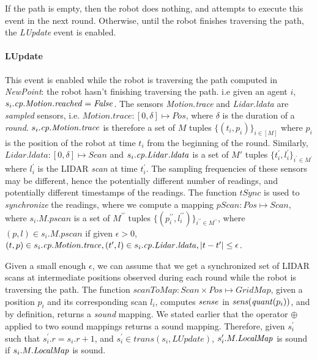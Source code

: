 If the path is empty, then the robot does nothing, and attempts to execute this event in the next round. Otherwise, until the robot finishes traversing the path, the \emph{LUpdate} event is enabled.

\paragraph{LUpdate}
This event is enabled while the robot is traversing the path computed in \emph{NewPoint}: the robot hasn't finishing traversing the path. i.e given an agent $i$, $s_i.\mathit{cp}.\mathit{Motion.reached}  = \mathit{False}$. The sensors \emph{Motion.trace} and \emph{Lidar.ldata} are \emph{sampled} sensors, i.e. $\mathit{Motion.trace}: [0,\delta] \mapsto \mathit{Pos}$, where $\delta$ is the duration of a \emph{round}. $s_i.\mathit{cp}.\mathit{Motion.trace}$ is therefore a set of $M$ tuples $\{(t_i, p_i)\}_{i \in [M]}$ where $p_i$ is the position of the robot at time $t_i$ from the beginning of the round. Similarly, $\mathit{Lidar.ldata} : [0,\delta]\mapsto \mathit{Scan}$ and $s_i.\mathit{cp}.\mathit{Lidar.ldata}$ is a set of $M'$ tuples $\{t_i^\prime, l_i^\prime\}_{i^\prime \in M^\prime}$ where $l_i^\prime$ is the LIDAR \emph{scan} at time $t_i^\prime$. The sampling frequencies of these sensors may be different, hence the potentially different number of readings, and potentially different timestamps of the readings. The function $\mathit{tSync}$ is used to \emph{synchronize} the readings, where we compute a mapping $\mathit{pScan}: \mathit{Pos} \mapsto \mathit{Scan}$, where $s_i.M.\mathit{pscan}$ is a set of $M^{\prime\prime}$ tuples $\{(p_i^{\prime\prime}, l_i^{\prime\prime})\}_{i^{\prime\prime} \in M ^{\prime\prime}}$, where  $(p, l) \in s_i.M.\mathit{pscan}$ if given $\epsilon > 0$,  $(t,p) \in s_i.\mathit{cp}.\mathit{Motion.trace}, (t^\prime,l )\in s_i.\mathit{cp}.\mathit{Lidar.ldata}, |t - t^\prime| \leq \epsilon$.

Given a small enough $\epsilon$, we can assume that we get a synchronized set of LIDAR scans at intermediate positions observed during each round while the robot is traversing the path. The function $\mathit{scanToMap}: \mathit{Scan} \times \mathit{Pos}\mapsto \mathit{GridMap}$, given a position $p_i$ and its corresponding scan $l_i$, computes $\mathit{sense}$ in $\mathit{sens}(\mathit{quant}(p_i))$, and by definition, returns a \emph{sound} mapping. We stated earlier that the operator $\oplus$ applied to two sound mappings returns a sound mapping. Therefore, given $s_i^\prime$ such that $s_i^\prime.r = s_i.r + 1$, and $\mathit{s_i^\prime \in \mathit{trans}(s_i,\mathit{LUpdate})}$,  $s_i^\prime.M.\mathit{LocalMap}$ is sound if $s_i.M.\mathit{LocalMap}$ is sound.

